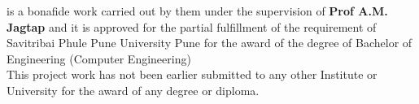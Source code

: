\noindent
is a bonafide work carried out by them under the supervision of \textbf{Prof A.M. Jagtap} and it is approved for the partial fulfillment of the requirement of Savitribai Phule Pune University Pune for the award of the degree of Bachelor of Engineering (Computer Engineering) \\

\noindent
This project work has not been earlier submitted to any other Institute or University for the award of any degree or diploma.
